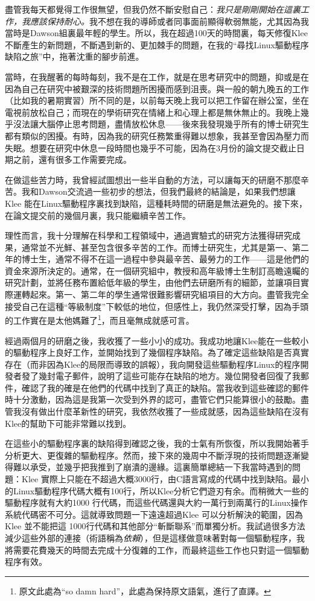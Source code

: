 \documentclass[12pt,UTF8,nofonts]{book}
\begin{document}
盡管我每天都覺得工作很無望，但我仍然不斷安慰自己：\emph{我只是剛剛開始在這裏工作，我應該保持耐心。}我不想在我的導師或者同事面前顯得軟弱無能，尤其因為我當時是Dawson組裏最年輕的學生。所以，我在超過100天的時間裏，每天修復Klee不斷產生的新問題，不斷遇到新的、更加棘手的問題，在我的“尋找Linux驅動程序缺陷之旅”中，拖著沈重的腳步前進。

當時，在我醒著的每時每刻，我不是在工作，就是在思考研究中的問題，抑或是在因為自己在研究中被艱深的技術問題所困擾而感到沮喪。與一般的朝九晚五的工作（比如我的暑期實習）所不同的是，以前每天晚上我可以把工作留在辦公室，坐在電視前放松自己；而現在的學術研究在情緒上和心理上都是無休無止的。我晚上幾乎沒法讓大腦停止思考問題，盡情放松休息——後來我發現幾乎所有的博士研究生都有類似的困擾。有時，因為我的研究任務繁重得難以想象，我甚至會因為壓力而失眠。想要在研究中休息一段時間也幾乎不可能，因為在3月份的論文提交截止日期之前，還有很多工作需要完成。

在做這些苦力時，我曾經試圖想出一些半自動的方法，可以讓每天的研磨不那麼辛苦。我和Dawson交流過一些初步的想法，但我們最終的結論是，如果我們想讓Klee 能在Linux驅動程序裏找到缺陷，這種耗時間的研磨是無法避免的。接下來，在論文提交前的幾個月裏，我只能繼續辛苦工作。

理性而言，我十分理解在科學和工程領域中，通過實驗式的研究方法獲得研究成果，通常並不光鮮、甚至包含很多辛苦的工作。而博士研究生，尤其是第一、第二年的博士生，通常不得不在這一過程中參與最辛苦、最勞力的工作——這是他們的資金來源所決定的。通常，在一個研究組中，教授和高年級博士生制訂高瞻遠矚的研究計劃，並將任務布置給低年級的學生，由他們去研磨所有的細節，並讓項目實際運轉起來。第一、第二年的學生通常很難影響研究組項目的大方向。盡管我完全接受自己在這種“等級制度”下較低的地位，但感性上，我仍然深受打擊，因為手頭的工作實在是太他媽難了\footnote{原文此處為“so damn hard”，此處為保持原文語氣，進行了直譯。}，而且毫無成就感可言。

\breakline

經過兩個月的研磨之後，我收獲了一些小小的成功。我成功地讓Klee能在一些較小的驅動程序上良好工作，並開始找到了幾個程序缺陷。為了確定這些缺陷是否真實存在（而非因為Klee的局限而導致的誤報），我向開發這些驅動程序Linux的程序開發者發了幾封電子郵件，說明了這些可能存在缺陷的地方。幾位開發者回復了我郵件，確認了我的確是在他們的代碼中找到了真正的缺陷。當我收到這些確認的郵件時十分激動，因為這是我第一次受到外界的認可，盡管它們只能算很小的鼓勵。盡管我沒有做出什麼革新性的研究，我依然收獲了一些成就感，因為這些缺陷在沒有Klee的幫助下可能非常難以找到。

在這些小的驅動程序裏的缺陷得到確認之後，我的士氣有所恢復，所以我開始著手分析更大、更復雜的驅動程序。然而，接下來的幾周中不斷浮現的技術問題逐漸變得難以承受，並幾乎把我推到了崩潰的邊緣。這裏簡單總結一下我當時遇到的問題：Klee 實際上只能在不超過大概3000行，由C語言寫成的代碼中找到缺陷。最小的Linux驅動程序代碼大概有100行，所以Klee分析它們遊刃有余。而稍微大一些的驅動程序就有大約1000 行代碼，而這些代碼還與大約一萬行到兩萬行的Linux操作系統代碼密不可分。這就導致問題一下遠遠超過Klee 可以分析解決的範圍，因為Klee 並不能把這
1000行代碼和其他部分“斬斷聯系”而單獨分析。我試過很多方法減少這些外部的連接（術語稱為\emph{依賴}），但是這樣做意味著對每一個驅動程序，我將需要花費幾天的時間去完成十分復雜的工作，而最終這些工作也只對這一個驅動程序有效。
\end{document}
